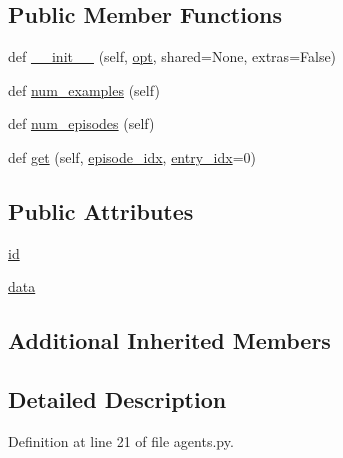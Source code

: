\subsection*{Public Member Functions}
\begin{DoxyCompactItemize}
\item 
def \hyperlink{classparlai_1_1tasks_1_1dialogue__nli_1_1agents_1_1DialogueNliTeacher_ab6931a1fbc88ffc407f35ba72cc44b76}{\+\_\+\+\_\+init\+\_\+\+\_\+} (self, \hyperlink{classparlai_1_1core_1_1agents_1_1Teacher_a3ce6243860ce978a897922863ed32fa4}{opt}, shared=None, extras=False)
\item 
def \hyperlink{classparlai_1_1tasks_1_1dialogue__nli_1_1agents_1_1DialogueNliTeacher_a54d9ea8b89d8b5b91c913612fba74726}{num\+\_\+examples} (self)
\item 
def \hyperlink{classparlai_1_1tasks_1_1dialogue__nli_1_1agents_1_1DialogueNliTeacher_a1277b756af5d3ca234c77526a7bfb5e2}{num\+\_\+episodes} (self)
\item 
def \hyperlink{classparlai_1_1tasks_1_1dialogue__nli_1_1agents_1_1DialogueNliTeacher_aa3dfbefa7098aa0336896dd7ac5698b9}{get} (self, \hyperlink{classparlai_1_1core_1_1teachers_1_1FixedDialogTeacher_afd4ebab8063eb42d182d30a1a41f133e}{episode\+\_\+idx}, \hyperlink{classparlai_1_1core_1_1teachers_1_1FixedDialogTeacher_ae3201b15f3c3b46a2f3511bad9b43e7d}{entry\+\_\+idx}=0)
\end{DoxyCompactItemize}
\subsection*{Public Attributes}
\begin{DoxyCompactItemize}
\item 
\hyperlink{classparlai_1_1tasks_1_1dialogue__nli_1_1agents_1_1DialogueNliTeacher_aec219032386350b637684f9ab46a09ab}{id}
\item 
\hyperlink{classparlai_1_1tasks_1_1dialogue__nli_1_1agents_1_1DialogueNliTeacher_ae213e3aeb7ef16760a0c62ff1f77454e}{data}
\end{DoxyCompactItemize}
\subsection*{Additional Inherited Members}


\subsection{Detailed Description}


Definition at line 21 of file agents.\+py.



